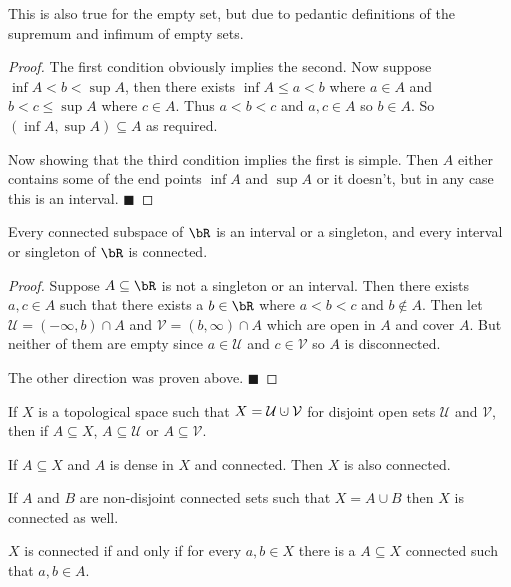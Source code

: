 \documentclass[10pt]{article}
\def\qed{\hskip1cm\penalty-100\hbox{}\hfill$\blacksquare$}
\def\mU{\mathcal{U}}
\def\mV{\mathcal{V}}
\begin{document}
This is also true for the empty set, but due to pedantic definitions of the supremum and infimum of empty sets.

\begin{proof}

    The first condition obviously implies the second.
    Now suppose $\inf A<b<\sup A$, then there exists $\inf A\leq a<b$ where $a\in A$ and $b<c\leq\sup A$ where $c\in A$.
    Thus $a<b<c$ and $a,c\in A$ so $b\in A$.
    So $(\inf A,\sup A)\subseteq A$ as required.

    Now showing that the third condition implies the first is simple.
    Then $A$ either contains some of the end points $\inf A$ and $\sup A$ or it doesn't, but in any case this is an interval.
    \qed

\end{proof}

\begin{prop*}

    Every connected subspace of $\bR$ is an interval or a singleton, and every interval or singleton of $\bR$ is connected.

\end{prop*}

\begin{proof}

    Suppose $A\subseteq\bR$ is not a singleton or an interval.
    Then there exists $a,c\in A$ such that there exists a $b\in\bR$ where $a<b<c$ and $b\notin A$.
    Then let $\mU=(-\infty,b)\cap A$ and $\mV=(b,\infty)\cap A$ which are open in $A$ and cover $A$.
    But neither of them are empty since $a\in\mU$ and $c\in\mV$ so $A$ is disconnected.

    The other direction was proven above.
    \qed

\end{proof}

\begin{prop*}

    \benum
        \item If $X$ is a topological space such that $X=\mU\dcup\mV$ for disjoint open sets $\mU$ and $\mV$, then if $A\subseteq X$, $A\subseteq\mU$ or $A\subseteq\mV$.
        \item If $A\subseteq X$ and $A$ is dense in $X$ and connected.
        Then $X$ is also connected.
        \item If $A$ and $B$ are non-disjoint connected sets such that $X=A\cup B$ then $X$ is connected as well.
        \item $X$ is connected if and only if for every $a,b\in X$ there is a $A\subseteq X$ connected such that $a,b\in A$.
    \eenum

\end{prop*}
\end{document}
